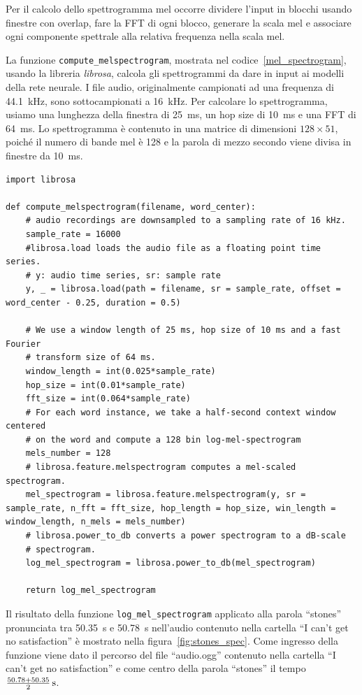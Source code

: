 \documentclass[12pt,a4paper,titlepage]{article}
\begin{document}
Per il calcolo dello spettrogramma mel occorre dividere l'input in blocchi usando finestre con overlap, fare la FFT di ogni blocco, generare la scala mel e associare ogni componente spettrale alla relativa frequenza nella scala mel.    

La funzione \texttt{compute\_melspectrogram}, mostrata nel codice~\ref{mel_spectrogram}, usando la libreria \emph{librosa}, calcola gli spettrogrammi da dare in input ai modelli della rete neurale. I file audio, originalmente campionati ad una frequenza di \SI{44.1}{\kilo \hertz}, sono sottocampionati a \SI{16}{\kilo \hertz}. Per calcolare lo spettrogramma, usiamo una lunghezza della finestra di \SI{25}{\milli \second}, un hop size di \SI{10}{\milli \second} e una FFT di \SI{64}{\milli \second}. Lo spettrogramma è contenuto in una matrice di dimensioni $128 \times 51$, poiché il numero di bande mel è 128 e la parola di mezzo secondo viene divisa in finestre da \SI{10}{\milli \second}.

\begin{lstlisting}[language=iPython,firstnumber=1, caption=mel\_spectrogram.py, label=mel_spectrogram,captionpos=b]
import librosa

def compute_melspectrogram(filename, word_center):
    # audio recordings are downsampled to a sampling rate of 16 kHz.
    sample_rate = 16000
    #librosa.load loads the audio file as a floating point time series.
    # y: audio time series, sr: sample rate
    y, _ = librosa.load(path = filename, sr = sample_rate, offset = word_center - 0.25, duration = 0.5)

    # We use a window length of 25 ms, hop size of 10 ms and a fast Fourier
    # transform size of 64 ms.
    window_length = int(0.025*sample_rate)
    hop_size = int(0.01*sample_rate)
    fft_size = int(0.064*sample_rate)
    # For each word instance, we take a half-second context window centered
    # on the word and compute a 128 bin log-mel-spectrogram
    mels_number = 128
    # librosa.feature.melspectrogram computes a mel-scaled spectrogram.
    mel_spectrogram = librosa.feature.melspectrogram(y, sr = sample_rate, n_fft = fft_size, hop_length = hop_size, win_length = window_length, n_mels = mels_number)
    # librosa.power_to_db converts a power spectrogram to a dB-scale
    # spectrogram.
    log_mel_spectrogram = librosa.power_to_db(mel_spectrogram)
    
    return log_mel_spectrogram
\end{lstlisting}

Il risultato della funzione \texttt{log\_mel\_spectrogram} applicato alla parola ``stones'' pronunciata tra \SI{50.35}{\second} e \SI{50.78}{\second} nell'audio contenuto nella cartella ``I can't get no satisfaction'' è mostrato nella figura~\ref{fig:stones_spec}. Come ingresso della funzione viene dato il percorso del file ``audio.ogg'' contenuto nella cartella ``I can't get no satisfaction'' e come centro della parola ``stones'' il tempo $\SI[parse-numbers=false]{\frac{50.78 + 50.35}{2}}{\second}$.
\end{document}
